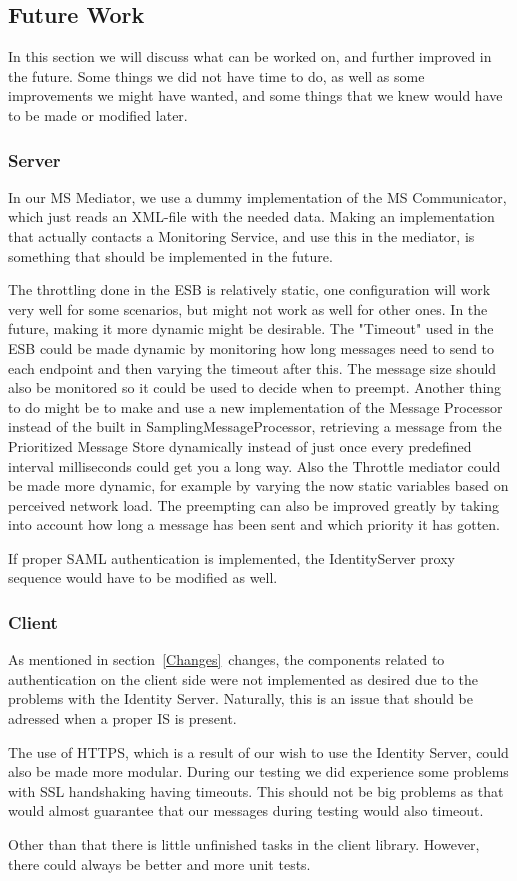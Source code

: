 \subsection{Future Work}\label{Future Work}
    In this section we will discuss what can be worked on, and further improved in the future. Some things we did not have time to do, as well as some improvements we might have wanted, and some things that we knew would have to be made or modified later.

    \subsubsection{Server}\label{Future:Server}
        In our MS Mediator, we use a dummy implementation of the MS Communicator, which just reads an XML-file with the needed data. Making an implementation that actually contacts a Monitoring Service, and use this in the mediator, is something that should be implemented in the future.

        The throttling done in the ESB is relatively static, one configuration will work very well for some scenarios, but might not work as well for other ones. In the future, making it more dynamic might be desirable. The "Timeout" used in the ESB could be made dynamic by monitoring how long messages need to send to each endpoint and then varying the timeout after this. The message size should also be monitored so it could be used to decide when to preempt. Another thing to do might be to make and use a new implementation of the Message Processor instead of the built in SamplingMessageProcessor, retrieving a message from the Prioritized Message Store dynamically instead of just once every predefined interval milliseconds could get you a long way. Also the Throttle mediator could be made more dynamic, for example by varying the now static variables based on perceived network load. The preempting can also be improved greatly by taking into account how long a message has been sent and which priority it has 
gotten.

        If proper SAML authentication is implemented, the IdentityServer proxy sequence would have to be modified as well.

	\subsubsection{Client}\label{Future:Client}
		As mentioned in section~\ref{Changes}~changes, the components related to authentication on the client side were not implemented as desired due to the problems with the Identity Server. Naturally, this is an issue that should be adressed when a proper IS is present.

		The use of HTTPS, which is a result of our wish to use the Identity Server, could also be made more modular. During our testing we did experience some problems with SSL handshaking having timeouts. This should not be big problems as that would almost guarantee that our messages during testing would also timeout.
		
    	Other than that there is little unfinished tasks in the client library. However, there could always be better and more unit tests. 

